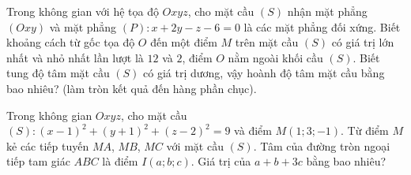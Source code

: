 \begin{ex}%
	Trong không gian với hệ tọa độ $Oxyz$, cho mặt cầu $(S)$ nhận mặt phẳng $(Oxy)$ và mặt phẳng $(P)\colon x + 2y - z - 6 = 0$ là các mặt phẳng đối xứng. Biết khoảng cách từ gốc tọa độ $O$ đến một điểm $M$ trên mặt cầu $(S)$ có giá trị lớn nhất và nhỏ nhất lần lượt là $12$ và $2$, điểm $O$ nằm ngoài khối cầu $(S)$. Biết tung độ tâm mặt cầu $(S)$ có giá trị dương, vậy hoành độ tâm mặt cầu bằng bao nhiêu? (làm tròn kết quả đến hàng phần chục).
	
	
\end{ex}

%

\begin{ex}%
	Trong không gian $Oxyz$, cho mặt cầu $(S)\colon(x-1)^2+(y+1)^2+(z-2)^2=9$ và điểm $M(1 ; 3 ;-1)$. Từ điểm $M$ kẻ các tiếp tuyến $MA$, $MB$, $MC$ với mặt cầu $(S)$. Tâm của đường tròn ngoại tiếp tam giác $ABC$ là điểm $I(a ; b ; c)$. Giá trị của $a+b+3c$ bằng bao nhiêu?
\end{ex}

